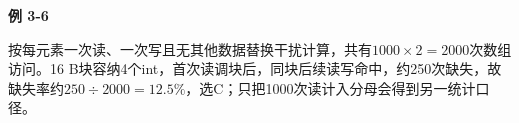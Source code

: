 {\color{ink}\bfseries 例 3-6}\par\vspace{1bp}按每元素一次读、一次写且无其他数据替换干扰计算，共有\(1000\times 2=\allowbreak{}2000\)次数组访问。16 B块容纳4个int，首次读调块后，同块后续读写命中，约250次缺失，故缺失率约\(250\div 2000=\allowbreak{}12.5\%\)，选C；只把1000次读计入分母会得到另一统计口径。
